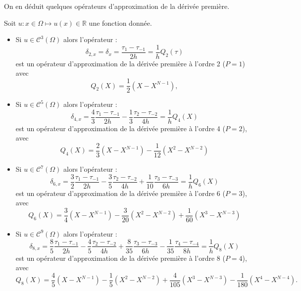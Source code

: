 On en déduit quelques opérateurs d'approximation de la dérivée première.
\begin{corollaire}
Soit $u :  x \in \Omega \mapsto u(x) \in \mathbb{R}$ une fonction donnée. 
\begin{itemize}
\item Si $u \in \mathcal{C}^3 (\Omega)$ alors l'opérateur :
\begin{equation}
\delta_{2,x} = \delta_x = \dfrac{\tau_1 - \tau_{-1}}{2h} = \dfrac{1}{h}Q_2(\tau)
\label{eq:derprem_order2}
\end{equation}
est un opérateur d'approximation de la dérivée première à l'ordre 2 ($P=1$) avec 
\begin{equation}
Q_2(X) = \dfrac{1}{2}(X-X^{N-1}),
\end{equation}
\item Si $u \in \mathcal{C}^5 (\Omega)$ alors l'opérateur :
\begin{equation}
\delta_{4,x} = \dfrac{4}{3} \dfrac{\tau_1 - \tau_{-1}}{2h} - \dfrac{1}{3} \dfrac{\tau_2 - \tau_{-2}}{4h} = \dfrac{1}{h}Q_4(X)
\label{eq:derprem_order4}
\end{equation}
est un opérateur d'approximation de la dérivée première à l'ordre 4 ($P=2$), avec
\begin{equation}
Q_4(X) = \dfrac{2}{3} (X-X^{N-1}) - \dfrac{1}{12} (X^2-X^{N-2})
\end{equation}
\item Si $u \in \mathcal{C}^7 (\Omega)$ alors l'opérateur :
\begin{equation}
\delta_{6,x} = \dfrac{3}{2} \dfrac{\tau_1 - \tau_{-1}}{2h} - \dfrac{3}{5} \dfrac{\tau_2 - \tau_{-2}}{4h} + \dfrac{1}{10} \dfrac{\tau_3 - \tau_{-3}}{6h} = \dfrac{1}{h} Q_6(X)
\label{eq:derprem_order6}
\end{equation}
est un opérateur d'approximation de la dérivée première à l'ordre 6 ($P=3$), avec
\begin{equation}
Q_6(X) = \dfrac{3}{4} (X-X^{N-1}) - \dfrac{3}{20} (X^2-X^{N-2}) + \dfrac{1}{60} (X^3-X^{N-3})
\end{equation}
\item Si $u \in \mathcal{C}^9 (\Omega)$ alors l'opérateur :
\begin{equation}
\delta_{8,x} = \dfrac{8}{5} \dfrac{\tau_1 - \tau_{-1}}{2h} - \dfrac{4}{5} \dfrac{\tau_2 - \tau_{-2}}{4h} + \dfrac{8}{35} \dfrac{\tau_3 - \tau_{-3}}{6h} - \dfrac{1}{35} \dfrac{\tau_4 - \tau_{-4}}{8h} = \dfrac{1}{h}Q_8(X)
\label{eq:derprem_order8}
\end{equation}
est un opérateur d'approximation de la dérivée première à l'ordre 8 ($P=4$), avec
\begin{equation}
Q_8(X) = \dfrac{4}{5} (X-X^{N-1}) - \dfrac{1}{5} (X^2-X^{N-2}) + \dfrac{4}{105} (X^3-X^{N-3}) - \dfrac{1}{180} (X^4-X^{N-4}).
\end{equation}
\end{itemize}
\end{corollaire} 

